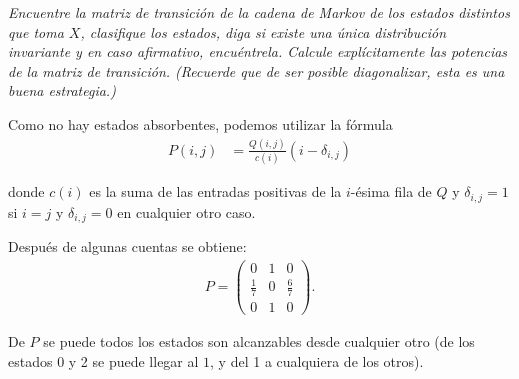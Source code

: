 \emph{
    Encuentre la matriz de transici\'on de la cadena de Markov de los estados distintos que toma $X$, 
    clasifique los estados, diga si existe una \'unica distribuci\'on invariante y en caso afirmativo, 
    encu\'entrela. Calcule expl\'icitamente las potencias de la matriz de transici\'on. 
    (Recuerde que de ser posible diagonalizar, esta es una buena estrategia.)\pn
}

\afterstatement\pn

Como no hay estados absorbentes, podemos utilizar la fórmula
\begin{align}
        P(i,j)  &=  \frac{Q(i, j)}{c(i)} (i-\delta_{i,j})
\end{align}

donde $c(i)$ es la suma de las entradas positivas de la $i$-ésima fila de $Q$ y $\delta_{i,j} = 1$
si $i = j$ y $\delta_{i,j} = 0$ en cualquier otro caso.\pn

Después de algunas cuentas se obtiene:
\begin{align}
     P=
        \begin{pmatrix}
            0           &   1   &   0               \\
            \frac{1}{7} &   0   &   \frac{6}{7}     \\
            0           &   1   &   0
        \end{pmatrix}.   
\end{align}\pn

De $P$ se puede todos los estados son alcanzables desde cualquier otro (de los estados 0 y 2 se puede llegar al $1$, y del 1 a cualquiera
de los otros).